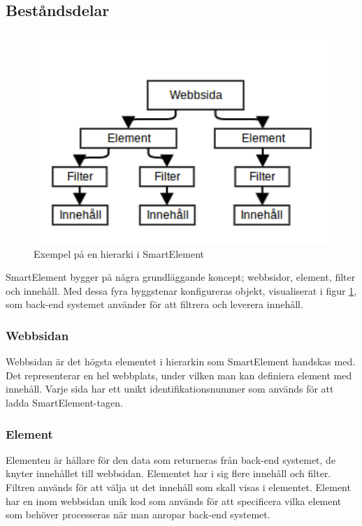 \subsection{Beståndsdelar}

\begin{figure}[h!]
\centering
\includegraphics[width=120mm]{assets/images/smelementdatamodelabstract.png}
\caption{Exempel på en hierarki i SmartElement}
\label{abstractstructure}
\end{figure}

SmartElement bygger på några grundläggande koncept; webbsidor, element, filter och innehåll. Med dessa fyra byggstenar konfigureras objekt, visualiserat i figur \ref{abstractstructure}, som back-end systemet använder för att filtrera och leverera innehåll.

\subsubsection{Webbsidan}

Webbsidan är det högsta elementet i hierarkin som SmartElement handskas med. Det representerar en hel webbplats, under vilken man kan definiera element med innehåll. Varje sida har ett unikt identifikationsnummer som används för att ladda SmartElement-tagen.

\subsubsection{Element}

Elementen är hållare för den data som returneras från back-end systemet, de knyter innehållet till webbsidan. Elementet har i sig flere innehåll och filter. Filtren används för att välja ut det innehåll som skall visas i elementet. Element har en inom webbsidan unik kod som används för att specificera vilka element som behöver processeras när man anropar back-end systemet.

